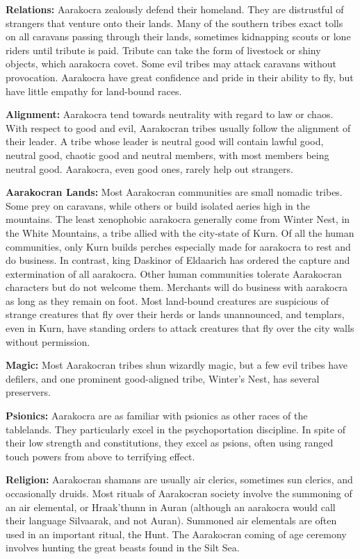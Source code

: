 
\textbf{Relations:} Aarakocra zealously defend their homeland. They are distrustful of strangers that venture onto their lands. Many of the southern tribes exact tolls on all caravans passing through their lands, sometimes kidnapping scouts or lone riders until tribute is paid. Tribute can take the form of livestock or shiny objects, which aarakocra covet. Some evil tribes may attack caravans without provocation. Aarakocra have great confidence and pride in their ability to fly, but have little empathy for land-bound races.

\textbf{Alignment:} Aarakocra tend towards neutrality with regard to law or chaos. With respect to good and evil, Aarakocran tribes usually follow the alignment of their leader. A tribe whose leader is neutral good will contain lawful good, neutral good, chaotic good and neutral members, with most members being neutral good. Aarakocra, even good ones, rarely help out strangers.

\textbf{Aarakocran Lands:} Most Aarakocran communities are small nomadic tribes. Some prey on caravans, while others or build isolated aeries high in the mountains. The least xenophobic aarakocra generally come from Winter Nest, in the White Mountains, a tribe allied with the city-state of Kurn. Of all the human communities, only Kurn builds perches especially made for aarakocra to rest and do business. In contrast, king Daskinor of Eldaarich has ordered the capture and extermination of all aarakocra. Other human communities tolerate Aarakocran characters but do not welcome them. Merchants will do business with aarakocra as long as they remain on foot. Most land-bound creatures are suspicious of strange creatures that fly over their herds or lands unannounced, and templars, even in Kurn, have standing orders to attack creatures that fly over the city walls without permission.

\textbf{Magic:} Most Aarakocran tribes shun wizardly magic, but a few evil tribes have defilers, and one prominent good-aligned tribe, Winter's Nest, has several preservers.

\textbf{Psionics:} Aarakocra are as familiar with psionics as other races of the tablelands. They particularly excel in the psychoportation discipline. In spite of their low strength and constitutions, they excel as psions, often using ranged touch powers from above to terrifying effect.

\textbf{Religion:} Aarakocran shamans are usually air clerics, sometimes sun clerics, and occasionally druids. Most rituals of Aarakocran society involve the summoning of an air elemental, or Hraak'thunn in Auran (although an aarakocra would call their language Silvaarak, and not Auran). Summoned air elementals are often used in an important ritual, the Hunt. The Aarakocran coming of age ceremony involves hunting the great beasts found in the Silt Sea.

